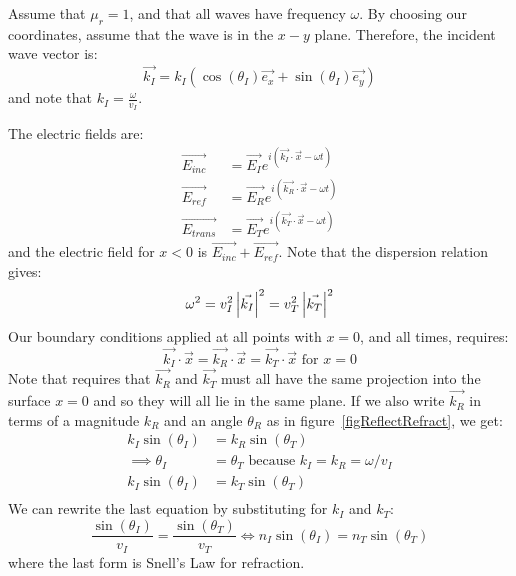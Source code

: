 \documentclass[../Main.tex]{subfiles}
\begin{document}
Assume that $\mu_r = 1$, and that all waves have frequency $\omega$. By choosing our coordinates, assume that the wave is in the $x-y$ plane. Therefore, the incident wave vector is:
\begin{equation*}
    \vec{k_I} = k_I \left(\cos(\theta_I) \vec{e_x} + \sin(\theta_I) \vec{e_y}\right)
\end{equation*}
and note that $k_I = \frac{\omega}{v_I}$.

The electric fields are:
\begin{align*}
    \vec{E_{inc}} &= \vec{E_I} e^{i(\vec{k_I} \cdot \vec{x} - \omega t)} \\
    \vec{E_{ref}} &= \vec{E_R} e^{i(\vec{k_R} \cdot \vec{x} - \omega t)} \\
    \vec{E_{trans}} &= \vec{E_T} e^{i(\vec{k_T} \cdot \vec{x} - \omega t)}
\end{align*}
and the electric field for $x < 0$ is $\vec{E_{inc}} + \vec{E_{ref}}$. Note that the dispersion relation gives:
\begin{equation*}
    \omega^2 = v_I^2 \left|\vec{k_I}\right|^2 = v_T^2 \left|\vec{k_T}\right|^2
\end{equation*}
Our boundary conditions applied at all points with $x = 0$, and all times, requires:
\begin{equation}
    \vec{k_I} \cdot \vec{x} = \vec{k_R} \cdot \vec{x} = \vec{k_T} \cdot \vec{x} \text{ for } x = 0
    \label{eqnWaveBC}
\end{equation}
Note that  requires that $\vec{k_R}$ and $\vec{k_T}$ must all have the same projection into the surface $x = 0$ and so they will all lie in the same plane. If we also write $\vec{k_R}$ in terms of a magnitude $k_R$ and an angle $\theta_R$ as in figure~\ref{figReflectRefract}, we get:
\begin{align*}
    k_I \sin(\theta_I) &= k_R \sin(\theta_T) \\
    \implies \theta_I &= \theta_T \text{ because $k_I = k_R = \omega / v_I$} \\
    k_I \sin(\theta_I) &= k_T \sin(\theta_T) \\
\end{align*}
We can rewrite the last equation by substituting for $k_I$ and $k_T$:
\begin{equation}
    \frac{\sin(\theta_I)}{v_I} = \frac{\sin(\theta_T)}{v_T} \iff n_I \sin(\theta_I) = n_T \sin(\theta_T)
    \label{eqnSnellsLaw}
\end{equation}
where the last form is Snell's Law for refraction.
\end{document}
